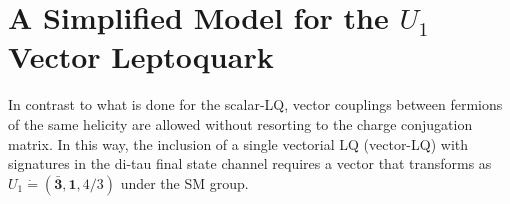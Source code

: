 



\section{A Simplified Model for the $U_1$ Vector Leptoquark}

In contrast to what is done for the scalar-LQ, vector couplings between fermions of the same helicity are allowed without resorting to the charge conjugation matrix. In this way, the inclusion of a single vectorial LQ (vector-LQ) with signatures in the di-tau final state channel requires a vector that transforms as $U_1  \dot= (\bar{\mathbf{3}}, \mathbf{1}, 4/3)$ under the SM group.

